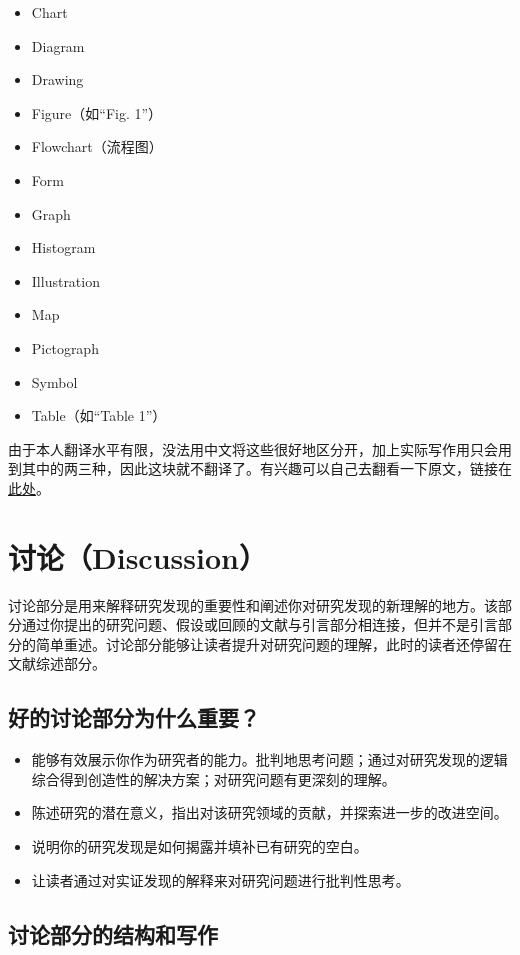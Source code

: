 \documentclass[cn,hazy,blue,14pt,screen]{elegantnote} %
\begin{document}
\begin{itemize}
  \item Chart
  \item Diagram
  \item Drawing
  \item Figure（如“Fig. 1”）
  \item Flowchart（流程图）
  \item Form
  \item Graph
  \item Histogram
  \item Illustration
  \item Map
  \item Pictograph
  \item Symbol
  \item Table（如“Table 1”）
\end{itemize}

由于本人翻译水平有限，没法用中文将这些很好地区分开，加上实际写作用只会用到其中的两三种，因此这块就不翻译了。有兴趣可以自己去翻看一下原文，链接在\href{https://libguides.usc.edu/writingguide/nontextual}{此处}。

\section{讨论（Discussion）}

讨论部分是用来解释研究发现的重要性和阐述你对研究发现的新理解的地方。该部分通过你提出的研究问题、假设或回顾的文献与引言部分相连接，但并不是引言部分的简单重述。讨论部分能够让读者提升对研究问题的理解，此时的读者还停留在文献综述部分。

\subsection{好的讨论部分为什么重要？}

\begin{itemize}
  \item 能够有效展示你作为研究者的能力。批判地思考问题；通过对研究发现的逻辑综合得到创造性的解决方案；对研究问题有更深刻的理解。
  \item 陈述研究的潜在意义，指出对该研究领域的贡献，并探索进一步的改进空间。
  \item 说明你的研究发现是如何揭露并填补已有研究的空白。
  \item 让读者通过对实证发现的解释来对研究问题进行批判性思考。
\end{itemize}

\subsection{讨论部分的结构和写作}
\end{document}
